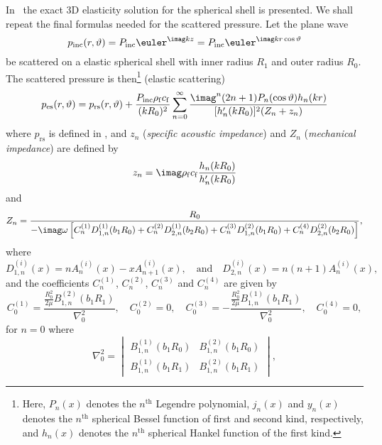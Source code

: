 In~\cite[pp. 12-20]{Chang1994voa} the exact 3D elasticity solution for the spherical shell is presented. We shall repeat the final formulas needed for the scattered pressure.
Let the plane wave
\begin{equation*}
	p_{\textrm{inc}}(r,\vartheta) = P_{\mathrm{inc}}\euler^{\imag kz} = P_{\mathrm{inc}}\euler^{\imag kr\cos\vartheta}
\end{equation*}
be scattered on a elastic spherical shell with inner radius $R_1$ and outer radius $R_0$. The scattered pressure is then\footnote{Here, $P_n(x)$ denotes the $n^{\mathrm{th}}$ Legendre polynomial, $j_n(x)$ and $y_n(x)$ denotes the $n^{\mathrm{th}}$ spherical Bessel function of first and second kind, respectively, and $h_n(x)$ denotes the $n^{\mathrm{th}}$ spherical Hankel function of the first kind.}  (elastic scattering)
\begin{equation}\label{Eq2:exact3DscatteringSphericalShellSol}
	p_{\mathrm{es}}(r,\vartheta) = p_{\mathrm{rs}}(r,\vartheta) + \frac{P_{\mathrm{inc}}\rho_{\mathrm{f}} c_{\mathrm{f}}}{(kR_0)^2}\sum_{n=0}^\infty \frac{\imag^n(2n+1)P_n(\cos\vartheta)h_n(kr)}{[h_n'(kR_0)]^2(Z_n+z_n)}
\end{equation}
where $p_{\mathrm{rs}}$ is defined in , and $z_n$ (\textit{specific acoustic impedance}) and $Z_n$ (\textit{mechanical impedance}) are defined by
\begin{equation*}
	z_n = \imag\rho_{\mathrm{f}} c_{\mathrm{f}}\frac{h_n(kR_0)}{h_n'(kR_0)}
\end{equation*}
and
\begin{equation*}
	Z_n =\frac{R_0}{-\imag\omega\left[C_n^{(1)} D_{1,n}^{(1)}(b_1 R_0) + C_n^{(2)} D_{2,n}^{(1)}(b_2 R_0) + C_n^{(3)} D_{1,n}^{(2)}(b_1 R_0) + C_n^{(4)} D_{2,n}^{(2)}(b_2 R_0)\right]},
\end{equation*}
where 
\begin{equation*}
	D_{1,n}^{(i)}(x) = nA_n^{(i)}(x)-xA_{n+1}^{(i)}(x),\quad\text{and}\quad	D_{2,n}^{(i)}(x) = n(n+1)A_n^{(i)}(x),
\end{equation*}
and the coefficients $C_n^{(1)}$, $C_n^{(2)}$, $C_n^{(3)}$ and $C_n^{(4)}$ are given by
\begin{equation*}
	C_0^{(1)} = \frac{\frac{R_0^2}{2\mu}B_{1,n}^{(2)}(b_1 R_1)}{\nabla^2_0},\quad C_0^{(2)}=0,\quad	C_0^{(3)} = -\frac{\frac{R_0^2}{2\mu}B_{1,n}^{(1)}(b_1 R_1)}{\nabla^2_0},\quad C_0^{(4)}=0,
\end{equation*}
for $n=0$ where
\begin{equation*}
	\nabla^2_0=\begin{vmatrix}
		B_{1,n}^{(1)}(b_1 R_0) & B_{1,n}^{(2)}(b_1 R_0)\\
		B_{1,n}^{(1)}(b_1 R_1) & B_{1,n}^{(2)}(b_1 R_1)
	\end{vmatrix},
\end{equation*}
